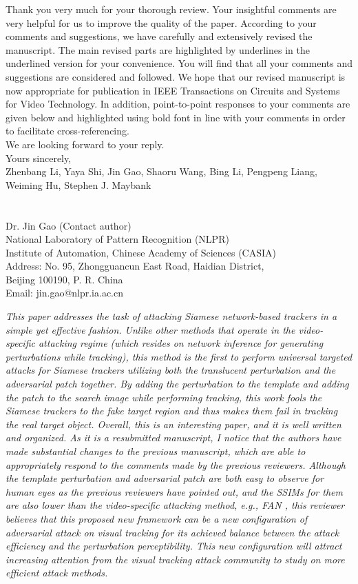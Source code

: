 \documentclass[12pt]{article}
\begin{document}
Thank you very much for your thorough review. Your insightful comments are very helpful for us to improve the quality of the paper. According to your comments and suggestions, we have carefully and extensively revised the manuscript. The main revised parts are highlighted by underlines in the underlined version for your convenience. You will find that all your comments and suggestions are considered and followed. We hope that our revised manuscript is now appropriate for publication in IEEE Transactions on Circuits and Systems for Video Technology.
In addition, point-to-point responses to your comments are given below and highlighted using bold font in line with your comments in order to facilitate cross-referencing.\\[10pt]
\indent We are looking forward to your reply.\\[10pt]
\noindent Yours sincerely,\\
\noindent Zhenbang Li, Yaya Shi, Jin Gao, Shaoru Wang, Bing Li, Pengpeng Liang, Weiming Hu, Stephen J. Maybank
\\
\\
\\
\noindent Dr. Jin Gao (Contact author)\\
\noindent National Laboratory of Pattern Recognition (NLPR)\\
\noindent Institute of Automation, Chinese Academy of Sciences (CASIA)\\
\noindent Address: No. 95, Zhongguancun East Road, Haidian District,\\
\noindent Beijing 100190, P. R. China\\
\noindent Email: jin.gao@nlpr.ia.ac.cn

\newpage
\textit{This paper addresses the task of attacking Siamese network-based trackers in a simple yet effective fashion. Unlike other methods that operate in the video-specific attacking regime (which resides on network inference for generating perturbations while tracking), this method is the first to perform universal targeted attacks for Siamese trackers utilizing both the translucent perturbation and the adversarial patch together. By adding the perturbation to the template and adding the patch to the search image while performing tracking, this work fools the Siamese trackers to the fake target region and thus makes them fail in tracking the real target object. Overall, this is an interesting paper, and it is well written and organized. As it is a resubmitted manuscript, I notice that the authors have made substantial changes to the previous manuscript, which are able to appropriately respond to the comments made by the previous reviewers. Although the template perturbation and adversarial patch are both easy to observe for human eyes as the previous reviewers have pointed out, and the SSIMs for them are also lower than the video-specific attacking method, e.g., FAN \cite{FAN}, this reviewer believes that this proposed new framework can be a new configuration of adversarial attack on visual tracking for its achieved balance between the attack efficiency and the perturbation perceptibility. This new configuration will attract increasing attention from the visual tracking attack community to study on more efficient attack methods.}
\end{document}

